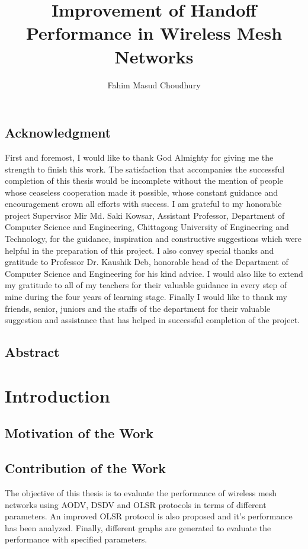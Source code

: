 \documentclass[12pt,a4paper]{report}
\author{Fahim Masud Choudhury}
\title{Improvement of Handoff Performance in Wireless Mesh Networks}
\begin{document}
\maketitle
\tableofcontents
\listoffigures

\newpage
\begin{center}
\section*{Acknowledgment}
\justify
First and foremost, I would like to thank God Almighty for giving me the strength to finish this work. The satisfaction that accompanies the successful completion of this thesis would be incomplete without the mention of people whose ceaseless cooperation made it possible, whose constant guidance and encouragement crown all efforts with success. I am grateful to my honorable project Supervisor Mir Md. Saki Kowsar, Assistant Professor, Department of Computer Science and Engineering, Chittagong University of Engineering and Technology, for the guidance, inspiration and constructive suggestions which were helpful in the preparation of this project. I also convey special thanks and gratitude to Professor Dr. Kaushik Deb, honorable head of the Department of Computer Science and Engineering for his kind advice. I would also like to extend my gratitude to all of my teachers for their valuable guidance in every step of mine during the four years of learning stage. Finally I would like to thank my friends, senior, juniors and the staffs of the department for their valuable suggestion and assistance that has helped in successful completion of the project.
\end{center}


\newpage
\begin{center}
\section*{Abstract}
\end{center}

\chapter{Introduction}
\section{Motivation of the Work}
\section{Contribution of the Work}
The objective of this thesis is to evaluate the performance of wireless mesh networks
using AODV, DSDV and OLSR protocols in terms of different parameters. 
An improved OLSR protocol is also proposed and it's performance has been analyzed. Finally, different graphs are generated to evaluate the performance with specified parameters.
\end{document}
